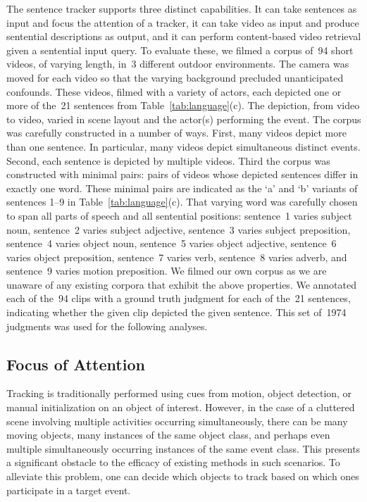The sentence tracker supports three distinct capabilities.
%
It can take sentences as input and focus the attention of a tracker, it can
take video as input and produce sentential descriptions as output, and it can
perform content-based video retrieval given a sentential input query.
%
To evaluate these, we filmed a corpus of~94 short videos, of varying
length, in~3 different outdoor environments.
%
The camera was moved for each video so that the varying background
precluded unanticipated confounds.
%
These videos, filmed with a variety of actors, each depicted one or more of
the~21 sentences from Table~\ref{tab:language}(c).
%
The depiction, from video to video, varied in scene layout and the actor(s)
performing the event.
%
The corpus was carefully constructed in a number of ways.
%
First, many videos depict more than one sentence.
%
In particular, many videos depict simultaneous distinct events.
%
Second, each sentence is depicted by multiple videos.
%
Third the corpus was constructed with minimal pairs: pairs of videos whose
depicted sentences differ in exactly one word.
%
These minimal pairs are indicated as the `a' and `b' variants of sentences 1--9
in Table~\ref{tab:language}(c).
%
That varying word was carefully chosen to span all parts of speech and all
sentential positions: sentence~1 varies subject noun, sentence~2 varies subject
adjective, sentence~3 varies subject preposition, sentence~4 varies object
noun, sentence~5 varies object adjective, sentence~6 varies object preposition,
sentence~7 varies verb, sentence~8 varies adverb, and sentence~9 varies
motion preposition.
%
We filmed our own corpus as we are unaware of any existing corpora that exhibit
the above properties.
%
We annotated each of the~94 clips with a ground truth judgment for each of
the~21 sentences, indicating whether the given clip depicted the given
sentence.
%
This set of~1974 judgments was used for the following analyses.

\vspace*{-3ex}
\subsection{Focus of Attention}
\label{subsec:foa}
\vspace*{-2ex}

Tracking is traditionally performed using cues from motion, object detection,
or manual initialization on an object of interest.
%
However, in the case of a cluttered scene involving multiple activities
occurring simultaneously, there can be many moving objects, many instances of
the same object class, and perhaps even multiple simultaneously occurring
instances of the same event class.
%
This presents a significant obstacle to the efficacy of existing methods in
such scenarios.
%
To alleviate this problem, one can decide which objects to track based on which
ones participate in a target event.

